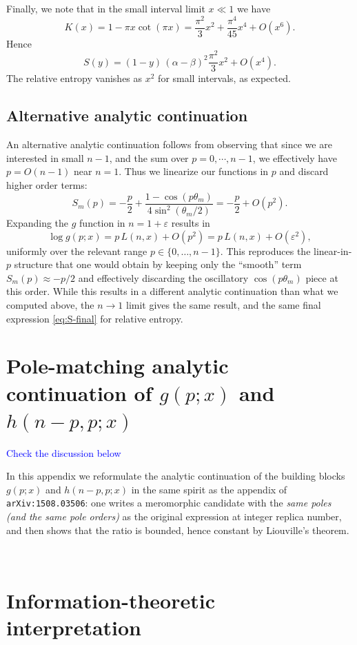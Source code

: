 \documentclass[11pt]{article}
\newcommand{\eps}{\varepsilon}
\newcommand{\NL}[1]{\textcolor{blue}{#1}}
\begin{document}
Finally, we note that in the small interval limit $x\ll 1$ we have
\begin{equation}
K(x)=1-\pi x\cot(\pi x)=\frac{\pi^2}{3}x^2+\frac{\pi^4}{45}x^4+O(x^6).
\end{equation}
Hence
\begin{equation}
S(y)= (1-y)\,(\alpha-\beta)^2\frac{\pi^2}{3}x^2+O(x^4).
\end{equation}
The relative entropy vanishes as $x^2$ for small intervals, as expected.

\subsection*{Alternative analytic continuation}
\label{sec:small-n1}

An alternative analytic continuation follows from observing that since we are interested in small $n-1$, and the sum over $p=0,\cdots, n-1$, we effectively have $p=O(n-1)$ near $n=1$. Thus we linearize our functions in $p$ and discard higher order terms:
\begin{equation}
S_m(p)= -\frac{p}{2}+\frac{1-\cos(p\theta_m)}{4\sin^2(\theta_m/2)}
= -\frac{p}{2}+O(p^2).
\label{eq:Sm-smallp}
\end{equation}
Expanding the $g$ function in $n=1+\eps$ results in
\begin{equation}
\log g(p;x)=p\,L(n,x)+O(p^2)=p\,L(n,x)+O(\eps^2),
\end{equation}
uniformly over the relevant range $p\in\{0,\dots,n-1\}$. This reproduces the linear-in-$p$
structure that one would obtain by keeping only the ``smooth'' term $S_m(p)\approx -p/2$ and
effectively discarding the oscillatory $\cos(p\theta_m)$ piece at this order. While this results in a different analytic continuation than what we computed above, the $n\to 1$ limit gives the same result, and the same final expression \eqref{eq:S-final} for relative entropy.

\section*{Pole-matching analytic continuation of $g(p;x)$ and $h(n-p,p;x)$}
\NL{Check the discussion below }

In this appendix we reformulate the analytic continuation of the building blocks
$g(p;x)$ and $h(n-p,p;x)$ in the same spirit as the appendix of \texttt{arXiv:1508.03506}:
one writes a meromorphic candidate with the \emph{same poles (and the same pole orders)}
as the original expression at integer replica number, and then shows that the ratio is
bounded, hence constant by Liouville's theorem.


\


\section*{Information-theoretic interpretation}

\end{document}
